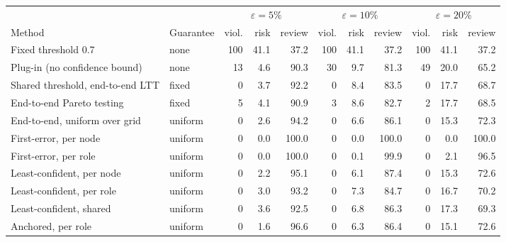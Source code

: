 \begin{tabular}{llrrrrrrrrr}
\toprule
 & & \multicolumn{3}{c}{$\varepsilon=5\%$} & \multicolumn{3}{c}{$\varepsilon=10\%$} & \multicolumn{3}{c}{$\varepsilon=20\%$} \\
\cmidrule(lr){3-5}\cmidrule(lr){6-8}\cmidrule(lr){9-11}
Method & Guarantee & viol. & risk & review & viol. & risk & review & viol. & risk & review \\
\midrule
Fixed threshold 0.7 & none & 100 & 41.1 & 37.2 & 100 & 41.1 & 37.2 & 100 & 41.1 & 37.2 \\
Plug-in (no confidence bound) & none & 13 & 4.6 & 90.3 & 30 & 9.7 & 81.3 & 49 & 20.0 & 65.2 \\
\midrule
Shared threshold, end-to-end LTT & fixed & 0 & 3.7 & 92.2 & 0 & 8.4 & 83.5 & 0 & 17.7 & 68.7 \\
End-to-end Pareto testing & fixed & 5 & 4.1 & 90.9 & 3 & 8.6 & 82.7 & 2 & 17.7 & 68.5 \\
End-to-end, uniform over grid & uniform & 0 & 2.6 & 94.2 & 0 & 6.6 & 86.1 & 0 & 15.3 & 72.3 \\
\midrule
First-error, per node & uniform & 0 & 0.0 & 100.0 & 0 & 0.0 & 100.0 & 0 & 0.0 & 100.0 \\
First-error, per role & uniform & 0 & 0.0 & 100.0 & 0 & 0.1 & 99.9 & 0 & 2.1 & 96.5 \\
\midrule
Least-confident, per node & uniform & 0 & 2.2 & 95.1 & 0 & 6.1 & 87.4 & 0 & 15.3 & 72.6 \\
Least-confident, per role & uniform & 0 & 3.0 & 93.2 & 0 & 7.3 & 84.7 & 0 & 16.7 & 70.2 \\
Least-confident, shared & uniform & 0 & 3.6 & 92.5 & 0 & 6.8 & 86.3 & 0 & 17.3 & 69.3 \\
Anchored, per role & uniform & 0 & 1.6 & 96.6 & 0 & 6.3 & 86.4 & 0 & 15.1 & 72.6 \\
\bottomrule
\end{tabular}
